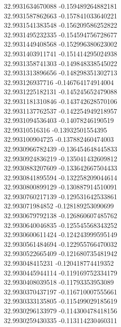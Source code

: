 {32.9931634670088	-0.159489264882181\\
32.9931587862663	-0.157841033640221\\
32.9931541383548	-0.156209586252822\\
32.9931495232335	-0.154594756728677\\
32.9931449408568	-0.152996380623002\\
32.9931403911741	-0.151414295024938\\
32.9931358741303	-0.149848338545022\\
32.9931313896656	-0.148298351302713\\
32.993126937716	-0.146764174914004\\
32.9931225182131	-0.145245652479088\\
32.9931181310846	-0.143742628570106\\
32.9931137762537	-0.142254949218957\\
32.9931094536403	-0.14078246190519\\
32.99310516316	-0.13932501554395\\
32.993100904725	-0.137882460474003\\
32.9930966782439	-0.136454648445833\\
32.9930924836219	-0.135041432609812\\
32.9930883207609	-0.133642667504433\\
32.9930841895594	-0.132258209044614\\
32.9930800899129	-0.130887914510091\\
32.9930760217139	-0.129531642533861\\
32.993071984852	-0.128189253090699\\
32.9930679792138	-0.126860607485762\\
32.9930640046835	-0.125545568343252\\
32.9930600611424	-0.124243999595149\\
32.9930561484694	-0.122955766470032\\
32.9930522665409	-0.121680735481942\\
32.993048415231	-0.120418774419352\\
32.9930445944114	-0.119169752334179\\
32.9930408039518	-0.11793353953089\\
32.9930370437197	-0.116710007555661\\
32.9930333135805	-0.115499029185619\\
32.9930296133979	-0.114300478418156\\
32.9930259430335	-0.113114230460311\\
}
